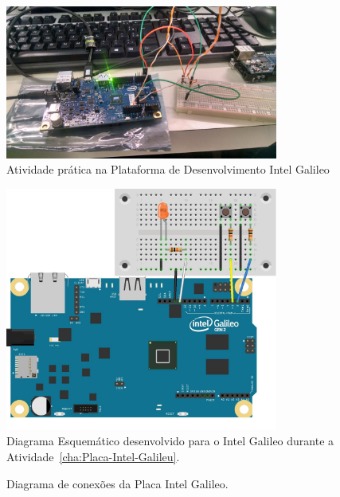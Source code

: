 \documentclass[
	12pt,				%
	openright,			%
  oneside,     %
	a4paper,			%
	english,			%
	french,				%
	spanish,			%
	brazil				%
	]{abntex2}
\begin{document}
\begin{figure}[ht]
  \centering
  \caption{\label{fig:IntelGalileo}Atividade prática na Plataforma de Desenvolvimento Intel Galileo}
  \includegraphics[width=0.8\textwidth]{images/Atividade08/IMG_20150721_145053115_HDR.jpg}
\end{figure}

\begin{figure}[ht]
  \centering
  \caption{\label{fig:05GalileoSchematic}Diagrama Esquemático desenvolvido para o Intel Galileo durante a Atividade~\ref{cha:Placa-Intel-Galileu}.}
  \includegraphics[width=0.8\textwidth]{images/Atividade08/05Schematic.jpg}
\end{figure}

\newpage
\begin{figure}[H]
  \centering
  \caption{\label{fig:cha-8-diagrama-conexoes-placa-galileo}Diagrama de conexões da Placa Intel Galileo.} 
   
\end{figure}
\end{document}
